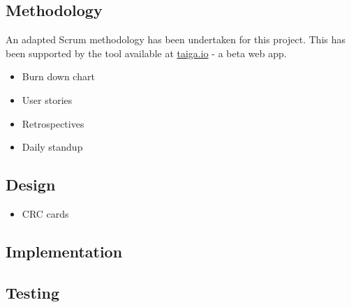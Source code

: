 \subsection{Methodology}

An adapted Scrum methodology has been undertaken for this project. This has been supported by the tool available at \url{taiga.io} - a beta web app.

\begin{itemize}
  \item Burn down chart
  \item User stories
  \item Retrospectives
  \item Daily standup
\end{itemize}

\subsection{Design}

\begin{itemize}
\item CRC cards
\end{itemize}

\subsection{Implementation}

\subsection{Testing}
